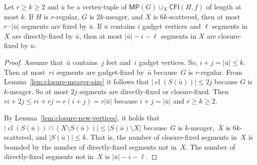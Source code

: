 \documentclass[]{lmcs}
\newcommand{\tup}[1]{\bar{#1}}
\newcommand{\vertA}{u}
\newcommand{\CFIsym}{\mathsf{CFI}}
\newcommand{\CFI}[1]{\CFIsym(#1)}
\newcommand{\tlength}[1]{| #1 |}
\newcommand{\multipede}[1]{\mathsf{MP}(#1)}
\newcommand{\footbset}{X}
\newcommand{\closure}[1]{\operatorname{cl}(#1)}
\newcommand{\gluing}[3]{#1 \cup_#2 #3}
\newcommand{\segmentOf}[1]{S(#1)}
\begin{document}
\begin{lem}
	\label{lem:number-fixed-segments}
	Let $r \geq k \geq 2$
	and $\tup{\vertA}$ be a vertex-tuple of $\gluing{\multipede{G}}{\footbset}{\CFI{H, f}}$ of length at most $k$.
	If $H$ is $r$-regular, 
	$G$ is $2k$-meager,
	and $\footbset$ is $6k$-scattered,
	then at most $r\cdot \tlength{\tup{\vertA}}$ segments are fixed by $\tup{\vertA}$.
	If $\tup{\vertA}$ contains $i$ gadget vertices and $\ell$ segments in $\footbset$ are directly-fixed by $\tup{\vertA}$,
	then at most $\tlength{\tup{\vertA}}-i-\ell$ segments in $\footbset$ are closure-fixed by $\tup{\vertA}$.
\end{lem}
\begin{proof}
	Assume that~$\tup{\vertA}$ contains~$j$ feet and~$i$ gadget vertices.
	So, $i + j = \tlength{\tup{\vertA}} \leq k$.
	Then at most~$r i$ segments are gadget-fixed by~$\tup{\vertA}$ because~$G$ is $r$-regular.
	From Lemma~\ref{lem:closure-meager-size}
	it follows that $|\closure{\segmentOf{\tup{\vertA}}}| \leq 2j$
	because $G$ is $k$-meager.
	So at most $2j$ segments are directly-fixed or closure-fixed.
	Then $r i + 2j \leq r i + r j = r(i + j) = r \tlength{\tup{\vertA}}$
	because $i+j = \tlength{\tup{\vertA}}$ and $r\geq k\geq 2$.
	
	By Lemma~\ref{lem:closure-new-vertices},
	it holds that $|\closure{\segmentOf{\tup{\vertA}}} \cap (\footbset \setminus \segmentOf{\tup{\vertA}})| \leq |\segmentOf{\tup{\vertA}} \setminus \footbset|$ because~$G$ is $k$\nobreakdash-meager,~$\footbset$ is $6k$\nobreakdash-scattered,
	and $|\segmentOf{\tup{\vertA}}|\leq k$.
	That is, the number of closure-fixed segments in~$\footbset$
	is bounded by the number of directly-fixed segments not in~$\footbset$.
	The number of directly-fixed segments not in~$\footbset$ is $\tlength{\tup{\vertA}}-i-\ell$.
\end{proof}
\end{document}

